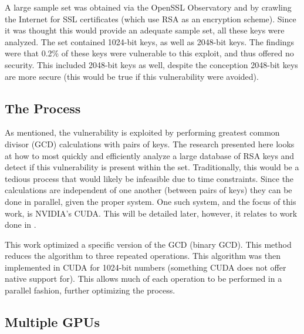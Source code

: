 \documentclass[smallextended]{svjour3}       %
\begin{document}
A large sample set was obtained via the OpenSSL Observatory and by crawling the
Internet for SSL certificates (which use RSA as an encryption scheme). Since it
was thought this would provide an adequate sample set, all these keys were
analyzed. The set contained 1024-bit keys, as well as 2048-bit keys. The
findings were that 0.2\% of these keys were vulnerable to this exploit, and
thus offered no security. This included 2048-bit keys as well, despite the
conception 2048-bit keys are more secure (this would be true if this
vulnerability were avoided).

\subsection{The Process}
\label{subsec:process}
As mentioned, the vulnerability is exploited by performing greatest common
divisor (GCD) calculations with pairs of keys. The research presented here
looks at how to most quickly and efficiently analyze a large database of
RSA keys and detect if this vulnerability is present within the set.
Traditionally, this would be a tedious process that would likely be infeasible
due to time constraints. Since the calculations are independent of one another
(between pairs of keys) they can be done in parallel, given the proper system.
One such system, and the focus of this work, is NVIDIA's CUDA. This will be
detailed later, however, it relates to work done in \cite{fujimoto2009high}. 

This work optimized a specific version of the GCD (binary GCD). This method
reduces the algorithm to three repeated operations. This algorithm was then
implemented in CUDA for 1024-bit numbers (something CUDA does not offer native
support for). This allows much of each operation to be performed in a parallel
fashion, further optimizing the process.

\subsection{Multiple GPUs}
\label{subsec:muliGPU}
%
\end{document}
